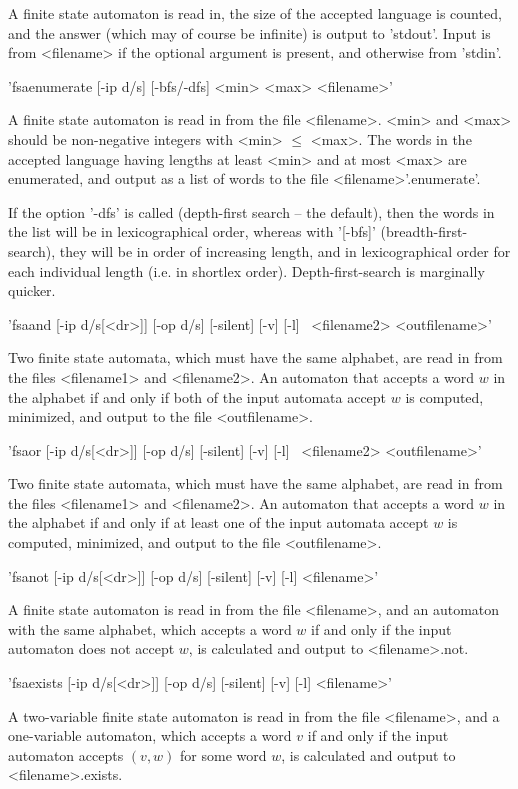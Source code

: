 A finite state automaton is read in,
the size of the accepted language is counted, and the answer (which may
of course be infinite) is output to 'stdout'.
Input is from <filename> if
the optional argument is present, and otherwise from 'stdin'.


'fsaenumerate  [-ip d/s] [-bfs/-dfs] <min> <max> <filename>'

A finite state automaton is read in from the file <filename>.
<min> and <max> should be non-negative integers with <min> $\le$ <max>.
The words in the accepted language having lengths at least <min> and at
most <max> are enumerated, and output as a list of words to the file
<filename>'.enumerate'.

If the option '-dfs' is called (depth-first search -- the default),
then the words
in the list will be in lexicographical order, whereas with '[-bfs]'
(breadth-first-search), they will be in order of increasing length, and in
lexicographical order for each individual length (i.e. in shortlex order).
Depth-first-search is marginally quicker.


'fsaand [-ip d/s[<dr>]] [-op d/s] [-silent] [-v] [-l]\
 <filename1> <filename2> <outfilename>'

Two finite state automata, which must have the same alphabet,
are read in from the files <filename1> and <filename2>. An automaton that
accepts a word $w$ in the alphabet if and only if both of the input automata
accept $w$ is computed, minimized, and output to the file <outfilename>.


'fsaor [-ip d/s[<dr>]] [-op d/s] [-silent] [-v] [-l]\
 <filename1> <filename2> <outfilename>'

Two finite state automata, which must have the same alphabet, are read in from
the files <filename1> and <filename2>. An automaton that accepts a word $w$ in
the alphabet if and only if at least one of the input automata
accept $w$ is computed, minimized, and output to the file <outfilename>.

\Section{fsanot}

'fsanot [-ip d/s[<dr>]] [-op d/s] [-silent] [-v] [-l] <filename>'

A finite state automaton is read in from the file <filename>, and an automaton
with the same alphabet, which accepts a word $w$ if and only if the input
automaton does not accept $w$, is calculated and output to <filename>.not.

\Section{fsaexists}

'fsaexists [-ip d/s[<dr>]] [-op d/s] [-silent] [-v] [-l] <filename>'

A two-variable finite state automaton is read in from the file <filename>,
and a one-variable automaton, which accepts a word $v$ if and only if the input
automaton accepts $(v,w)$ for some word $w$,
is calculated and output to <filename>.exists.
